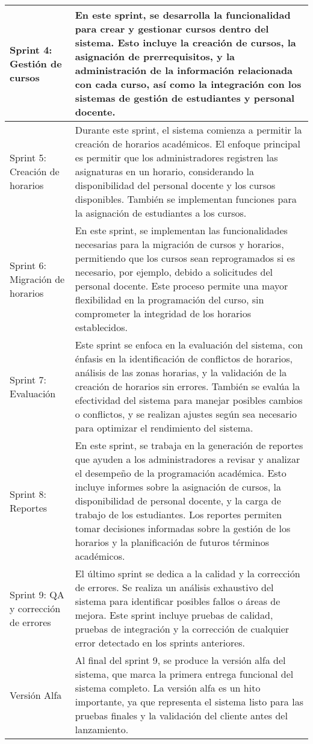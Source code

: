 \begin{longtable}{p{3in}|p{3in}}
Sprint 4: Gestión de cursos & 
En este sprint, se desarrolla la funcionalidad para crear y gestionar cursos dentro del sistema.
Esto incluye la creación de cursos, la asignación de prerrequisitos, y la administración de la información relacionada con cada curso, así como la integración con los sistemas de gestión de estudiantes y personal docente. \\
\hline

Sprint 5: Creación de horarios & 
Durante este sprint, el sistema comienza a permitir la creación de horarios académicos.
El enfoque principal es permitir que los administradores registren las asignaturas en un horario, considerando la disponibilidad del personal docente y los cursos disponibles. También se implementan funciones para la asignación de estudiantes a los cursos. \\
\hline

Sprint 6: Migración de horarios & 
En este sprint, se implementan las funcionalidades necesarias para la migración de cursos y horarios, permitiendo que los cursos sean reprogramados si es necesario, por ejemplo, debido a solicitudes del personal docente.
Este proceso permite una mayor flexibilidad en la programación del curso, sin comprometer la integridad de los horarios establecidos. \\
\hline

Sprint 7: Evaluación & 
Este sprint se enfoca en la evaluación del sistema, con énfasis en la identificación de conflictos de horarios, análisis de las zonas horarias, y la validación de la creación de horarios sin errores.
También se evalúa la efectividad del sistema para manejar posibles cambios o conflictos, y se realizan ajustes según sea necesario para optimizar el rendimiento del sistema. \\
\hline

Sprint 8: Reportes & 
En este sprint, se trabaja en la generación de reportes que ayuden a los administradores a revisar y analizar el desempeño de la programación académica.
Esto incluye informes sobre la asignación de cursos, la disponibilidad de personal docente, y la carga de trabajo de los estudiantes. Los reportes permiten tomar decisiones informadas sobre la gestión de los horarios y la planificación de futuros términos académicos. \\
\hline

Sprint 9: QA y corrección de errores & 
El último sprint se dedica a la calidad y la corrección de errores.
Se realiza un análisis exhaustivo del sistema para identificar posibles fallos o áreas de mejora. Este sprint incluye pruebas de calidad, pruebas de integración y la corrección de cualquier error detectado en los sprints anteriores. \\
\hline

Versión Alfa & 
Al final del sprint 9, se produce la versión alfa del sistema, que marca la primera entrega funcional del sistema completo.
La versión alfa es un hito importante, ya que representa el sistema listo para las pruebas finales y la validación del cliente antes del lanzamiento. \\
\hline

\end{longtable}
